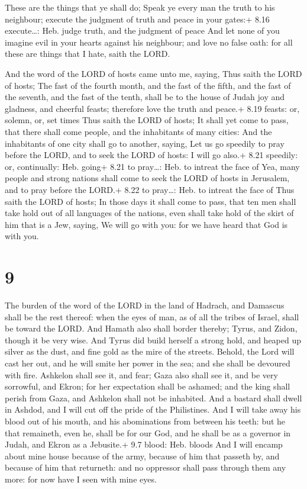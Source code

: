  These are the things that ye shall do; Speak ye every
man the truth to his neighbour; execute the judgment of truth and peace
in your gates:+ 8.16 execute\ldots: Heb. judge truth, and the judgment
of peace  And let none of you imagine evil in your hearts
against his neighbour; and love no false oath: for all these are things
that I hate, saith the LORD.

 And the word of the LORD of hosts came unto me, saying,
 Thus saith the LORD of hosts; The fast of the fourth
month, and the fast of the fifth, and the fast of the seventh, and the
fast of the tenth, shall be to the house of Judah joy and gladness, and
cheerful feasts; therefore love the truth and peace.+ 8.19 feasts: or,
solemn, or, set times  Thus saith the LORD of hosts; It
shall yet come to pass, that there shall come people, and the
inhabitants of many cities:  And the inhabitants of one
city shall go to another, saying, Let us go speedily to pray before the
LORD, and to seek the LORD of hosts: I will go also.+ 8.21 speedily: or,
continually: Heb. going+ 8.21 to pray\ldots: Heb. to intreat the face of
 Yea, many people and strong nations shall come to seek the
LORD of hosts in Jerusalem, and to pray before the LORD.+ 8.22 to
pray\ldots: Heb. to intreat the face of  Thus saith the
LORD of hosts; In those days it shall come to pass, that ten men shall
take hold out of all languages of the nations, even shall take hold of
the skirt of him that is a Jew, saying, We will go with you: for we have
heard that God is with you.

\hypertarget{section-8}{%
\section{9}\label{section-8}}

 The burden of the word of the LORD in the land of Hadrach,
and Damascus shall be the rest thereof: when the eyes of man, as of all
the tribes of Israel, shall be toward the LORD.  And Hamath
also shall border thereby; Tyrus, and Zidon, though it be very wise.
 And Tyrus did build herself a strong hold, and heaped up
silver as the dust, and fine gold as the mire of the streets.
 Behold, the Lord will cast her out, and he will smite her
power in the sea; and she shall be devoured with fire. 
Ashkelon shall see it, and fear; Gaza also shall see it, and be very
sorrowful, and Ekron; for her expectation shall be ashamed; and the king
shall perish from Gaza, and Ashkelon shall not be inhabited.
 And a bastard shall dwell in Ashdod, and I will cut off the
pride of the Philistines.  And I will take away his blood
out of his mouth, and his abominations from between his teeth: but he
that remaineth, even he, shall be for our God, and he shall be as a
governor in Judah, and Ekron as a Jebusite.+ 9.7 blood: Heb. bloods
 And I will encamp about mine house because of the army,
because of him that passeth by, and because of him that returneth: and
no oppressor shall pass through them any more: for now have I seen with
mine eyes.


